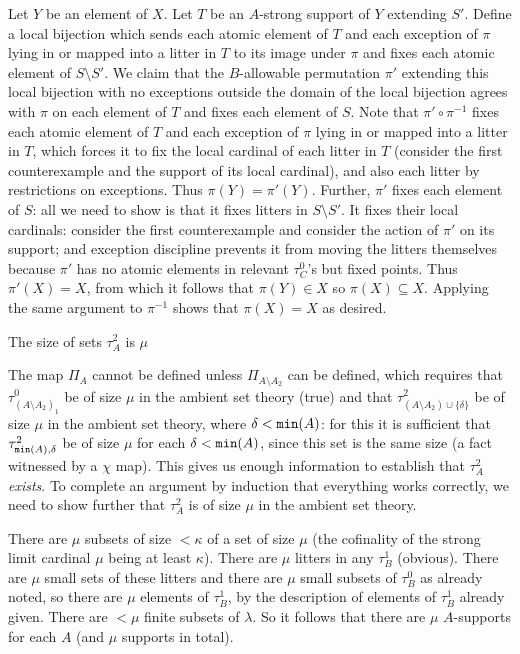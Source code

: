 \documentclass{slides}
\begin{document}
Let $Y$ be an element of $X$.  Let $T$ be an $A$-strong support of $Y$ extending $S'$.   Define a local bijection which sends each atomic element of $T$ and each exception of $\pi$ lying in or mapped into a litter in $T$ to its image under $\pi$
and fixes each atomic element of $S \setminus S'$.  We claim that the $B$-allowable permutation $\pi'$ extending this local bijection with no exceptions outside the domain of the local bijection  agrees with $\pi$ on each element of $T$ and fixes each element of $S$.  Note that $\pi' \circ \pi^{-1}$ fixes each atomic element of $T$ and each exception of $\pi$ lying in or mapped into a litter in $T$, which forces it to fix the local cardinal of each litter in $T$ (consider the first counterexample and the support of its local cardinal), and also each litter by restrictions on exceptions.  Thus $\pi(Y) = \pi'(Y)$.  Further,
$\pi'$ fixes each element of $S$:  all we need to show is that it fixes litters in $S \setminus S'$.  It fixes their local cardinals:  consider the first counterexample and consider the action of
$\pi'$ on its support; and exception discipline prevents it from moving the litters themselves because $\pi'$ has no atomic elements in relevant $\tau^0_C$'s but fixed points.
Thus $\pi'(X)=X$, from which it follows that $\pi(Y) \in X$ so $\pi(X) \subseteq X$.  Applying the same argument to $\pi^{-1}$ shows that $\pi(X)=X$ as desired.

\begin{slide}

{\Large The size of sets $\tau^2_A$ is $\mu$}

The map $\Pi_A$ cannot be defined unless  $\Pi_{A \setminus A_2}$ can be defined, which requires that $\tau^0_{(A \setminus A_2)_1}$ be of size $\mu$ in the ambient set theory (true)
and that $\tau^2_{(A \setminus A_2) \cup \{\delta\}}$ be of size $\mu$ in the ambient set theory, where $\delta <{\tt min}(A)$:  for this it is sufficient that $\tau^2_{{\tt min}(A),\delta}$ be
of size $\mu$ for each $\delta<{\tt min}(A)$, since this set is the same size (a fact witnessed by a $\chi$ map).  This gives us enough information to establish
that $\tau^2_A$ {\em exists\/}.  To complete an argument by induction that everything works correctly, we need to show further that $\tau^2_A$ is of size $\mu$ in the ambient set theory.

\end{slide}

\begin{slide}

There are $\mu$ subsets of size $<\kappa$ of a set of size $\mu$ (the cofinality of the strong limit cardinal $\mu$ being at least $\kappa$).  There are $\mu$ litters
in any $\tau^1_B$ (obvious).  There are $\mu$ small sets of these litters and there are $\mu$ small subsets of $\tau^0_B$ as already noted, so there are $\mu$ elements of
$\tau^1_B$, by the description of elements of $\tau^1_B$ already given.  There are $<\mu$ finite subsets of $\lambda$.  So it follows that there are $\mu$ $A$-supports
for each $A$ (and $\mu$ supports in total).

\end{slide}
\end{document}
